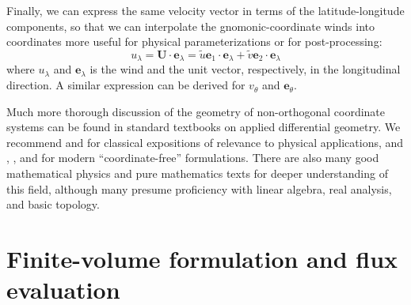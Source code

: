 \documentclass[10pt,letterpaper,margin=1in]{memoir}
\begin{document}
Finally, we can express the same velocity vector in terms of the latitude-longitude components, so that we can interpolate the gnomonic-coordinate winds into coordinates more useful for physical parameterizations or for post-processing:
\begin{equation}
u_\lambda = \mathbf{U} \cdot \mathbf{e}_\lambda = \widetilde{u} \mathbf{e}_1 \cdot \mathbf{e}_\lambda + \widetilde{v} \mathbf{e}_2 \cdot \mathbf{e}_\lambda
\end{equation}
where $u_\lambda$ and $\mathbf{e}_\lambda$ is the wind and the unit vector, respectively, in the longitudinal direction. A similar expression can be derived for $v_\theta$ and $\mathbf{e}_\theta$.

Much more thorough discussion of the geometry of non-orthogonal coordinate systems can be found in standard textbooks on applied differential geometry. We recommend \citet{Aris2012} and \citet{Landau1975} for classical expositions of relevance to physical applications, and \citet{Frankel2011}, \citet{BurkeApplied}, and \citet{Schutz1980} for modern ``coordinate-free'' formulations. There are also many good mathematical physics and pure mathematics texts for deeper understanding of this field, although many presume proficiency with linear algebra, real analysis, and basic topology.



\chapter{Finite-volume formulation and flux evaluation} \label{chap:flux}
\end{document}

